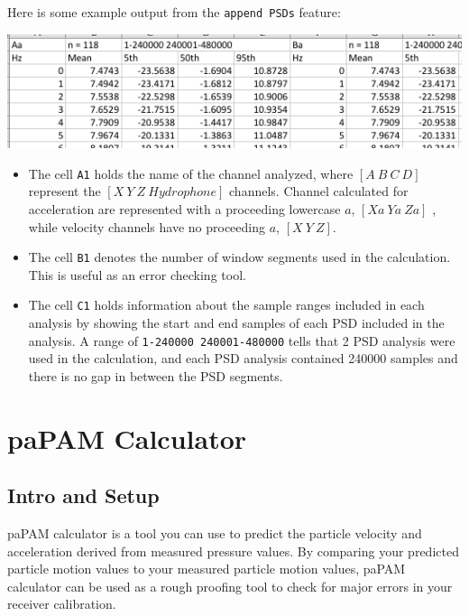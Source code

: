 \documentclass[11pt]{report}
\begin{document}
\begin{enumerate}
\begin{enumerate}
\end{enumerate}

Here is some example output from the \texttt{append PSDs} feature:

\includegraphics[scale=0.6,clip = true,trim = 0 0 0 0]{6.png}\\

\begin{itemize}
\item The cell \texttt{A1} holds the name of the channel analyzed, where $[A\ B\ C\ D]$ represent the $[X\ Y\ Z\ Hydrophone]$ channels.  Channel calculated for acceleration are represented with a proceeding lowercase $a$, $[Xa\ Ya\ Za]$ , while velocity channels have no proceeding $a$, $[X\ Y\ Z]$.

\item The cell \texttt{B1} denotes the number of window segments used in the calculation.  This is useful as an error checking tool.

\item The cell \texttt{C1} holds information about the sample ranges included in each analysis by showing the start and end samples of each PSD included in the analysis.  A range of \texttt{1-240000 240001-480000} tells that 2 PSD analysis were used in the calculation, and each PSD analysis contained 240000 samples and there is no gap in between the PSD segments.
\end{itemize}

\end{enumerate}

\chapter{paPAM Calculator}

\section{Intro and Setup}
paPAM calculator is a tool you can use to predict the particle velocity and acceleration derived from measured pressure values.  By comparing your predicted particle motion values to your measured particle motion values, paPAM calculator can be used as a rough proofing tool to check for major errors in your receiver calibration.
\end{document}

